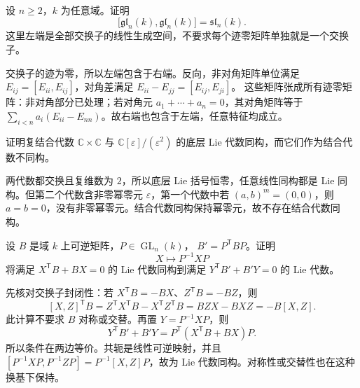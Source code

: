 \begin{exercise}\label{b5:ex:11-commutator-span}
	设 \(n\ge2\)，\(k\) 为任意域。证明
	\[
		\bigl[\mathfrak{gl}_n(k),\mathfrak{gl}_n(k)\bigr]=\mathfrak{sl}_n(k).
	\]
	这里左端是全部交换子的线性生成空间，不要求每个迹零矩阵单独就是一个交换子。
\end{exercise}
\begin{solution}
	交换子的迹为零，所以左端包含于右端。反向，非对角矩阵单位满足 \(E_{ij}=[E_{ii},E_{ij}]\)，对角差满足 \(E_{ii}-E_{jj}=[E_{ij},E_{ji}]\)。 这些矩阵张成所有迹零矩阵：非对角部分已处理；若对角元 \(a_1+\cdots+a_n=0\)，其对角矩阵等于 \(\sum_{i<n}a_i(E_{ii}-E_{nn})\)。故右端也包含于左端，任意特征均成立。
\end{solution}

\begin{exercise}\label{b5:ex:11-forgetting-associative}
	证明复结合代数 \(\mathbb C\times\mathbb C\) 与 \(\mathbb C[\varepsilon]/(\varepsilon^2)\) 的底层 Lie 代数同构，而它们作为结合代数不同构。
\end{exercise}
\begin{solution}
	两代数都交换且复维数为 \(2\)，所以底层 Lie 括号恒零，任意线性同构都是 Lie 同构。但第二个代数含非零幂零元 \(\varepsilon\)，第一个代数中若 \((a,b)^m=(0,0)\)，则 \(a=b=0\)，没有非零幂零元。结合代数同构保持幂零元，故不存在结合代数同构。
\end{solution}

\begin{exercise}\label{b5:ex:11-change-bilinear-matrix}
	设 \(B\) 是域 \(k\) 上可逆矩阵，\(P\in\operatorname{GL}_n(k)\)， \(B'=P^{\mathsf T}BP\)。证明
	\[
		X\longmapsto P^{-1}XP
	\]
	将满足 \(X^{\mathsf T}B+BX=0\) 的 Lie 代数同构到满足 \(Y^{\mathsf T}B'+B'Y=0\) 的 Lie 代数。
\end{exercise}
\begin{solution}
	先核对交换子封闭性：若 \(X^{\mathsf T}B=-BX\)、\(Z^{\mathsf T}B=-BZ\)，则
	\[
		[X,Z]^{\mathsf T}B =Z^{\mathsf T}X^{\mathsf T}B-X^{\mathsf T}Z^{\mathsf T}B =BZX-BXZ=-B[X,Z].
	\]
	此计算不要求 \(B\) 对称或交替。再置 \(Y=P^{-1}XP\)，则
	\[
		Y^{\mathsf T}B'+B'Y =P^{\mathsf T}(X^{\mathsf T}B+BX)P.
	\]
	所以条件在两边等价。共轭是线性可逆映射，并且 \([P^{-1}XP,P^{-1}ZP]=P^{-1}[X,Z]P\)，故为 Lie 代数同构。对称性或交替性也在这种换基下保持。
\end{solution}

